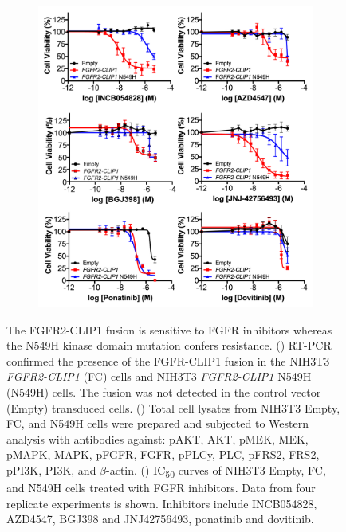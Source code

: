 \begin{figure}[htbp]
\begin{minipage}[t]{0.22\textwidth}
\begin{subfigure}{\textwidth}
            \caption{}\label{fig:240:fusion_downstream_western}
        \end{subfigure}
    \end{minipage}
    \hfill
    \begin{minipage}[t]{0.73\textwidth}
        \vspace{0pt}
        \begin{subfigure}{\textwidth}
            \includegraphics[width=\textwidth,keepaspectratio]{images/240/fusion_ic50_curves}
            \caption{}\label{fig:240:fusion_ic50_curves}
        \end{subfigure}
    \end{minipage}
    \caption[N549H confers FGFR inhibitor resistance to the FGFR2-CLIP1 fusion.]{The FGFR2-CLIP1 fusion is sensitive to FGFR inhibitors whereas the N549H kinase domain mutation confers resistance. () RT-PCR confirmed the presence of the FGFR-CLIP1 fusion in the NIH3T3 \textit{FGFR2-CLIP1} (FC) cells and NIH3T3 \textit{FGFR2-CLIP1} N549H (N549H) cells. The fusion was not detected in the control vector (Empty) transduced cells. () Total cell lysates from NIH3T3 Empty, FC, and N549H cells were prepared and subjected to Western analysis with antibodies against: pAKT, AKT, pMEK, MEK, pMAPK, MAPK, pFGFR, FGFR, pPLCy, PLC, pFRS2, FRS2, pPI3K, PI3K, and $\beta$-actin. () IC\textsubscript{50} curves of NIH3T3 Empty, FC, and N549H cells treated with FGFR inhibitors. Data from four replicate experiments is shown. Inhibitors include INCB054828, AZD4547, BGJ398 and JNJ42756493, ponatinib and dovitinib. }
    \label{fig:240:fusion_assays}
\end{figure}

